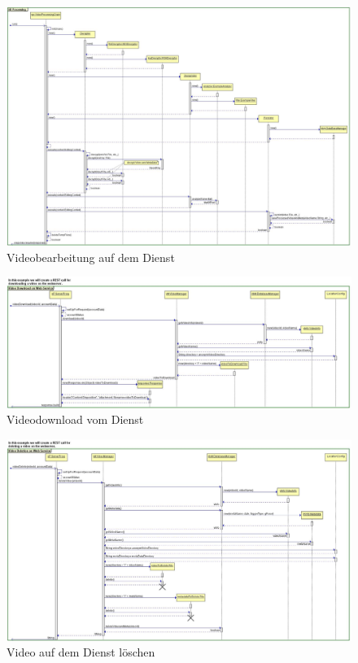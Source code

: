 \begin{figure}[ht]
	\centering
\includegraphics[width=1\textwidth]{./resources/Diagramme/Webservice/Processing.jpg}
\caption{Videobearbeitung auf dem Dienst}
	\label{fig:ServiceProcess}
\end{figure}

\begin{figure}[ht]
	\centering
\includegraphics[width=1\textwidth]{./resources/Diagramme/Webservice/SeqVideoDownload.jpg}
\caption{Videodownload vom Dienst}
	\label{fig:ServiceDownl}
\end{figure}

\begin{figure}[ht]
	\centering
\includegraphics[width=1\textwidth]{./resources/Diagramme/Webservice/SeqVideoDeletion.jpg}
\caption{Video auf dem Dienst löschen}
	\label{fig:ServiceDel}
\end{figure}

